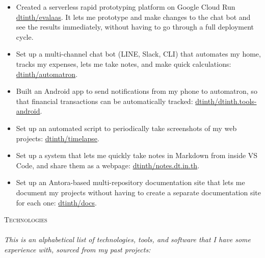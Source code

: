 \documentclass[a4paper]{article}
\newcommand{\lineunder} {
    \vspace*{-8pt} \\
    \hspace*{-18pt} \hrulefill \\
}
\newcommand{\header} [1] {
    {\hspace*{-18pt}\vspace*{6pt} \textsc{#1}}
    \vspace*{-6pt} \lineunder
}
\newcommand{\github} [1] {\href{https://github.com/#1}{#1}}
\begin{document}
\begin{itemize} \itemsep 1pt
    
	\item Created a serverless rapid prototyping platform on Google Cloud Run \github{dtinth/evalaas}. It lets me prototype and make changes to the chat bot and see the results immediately, without having to go through a full deployment cycle.
    
	\item Set up a multi-channel chat bot (LINE, Slack, CLI) that automates my home, tracks my expenses, lets me take notes, and make quick calculations: \github{dtinth/automatron}.
    
	\item Built an Android app to send notifications from my phone to automatron, so that financial transactions can be automatically tracked: \github{dtinth/dtinth.tools-android}.
    
	\item Set up an automated script to periodically take screenshots of my web projects: \github{dtinth/timelapse}.
    
	\item Set up a system that lets me quickly take notes in Markdown from inside VS Code, and share them as a webpage: \github{dtinth/notes.dt.in.th}.
    
	\item Set up an Antora-based multi-repository documentation site that lets me document my projects without having to create a separate documentation site for each one: \github{dtinth/docs}.
    
\end{itemize}

\vspace{2mm}





\header{Technologies}

\textit{This is an alphabetical list of technologies, tools, and software that I have some experience with, sourced from my past projects:}

\vspace{2mm}
\end{document}

